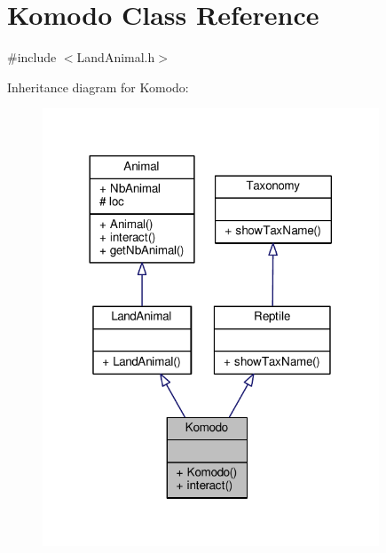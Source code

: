 \hypertarget{classKomodo}{}\section{Komodo Class Reference}
\label{classKomodo}


{\ttfamily \#include $<$Land\+Animal.\+h$>$}



Inheritance diagram for Komodo\+:
\nopagebreak
\begin{figure}[H]
\begin{center}
\leavevmode
\includegraphics[width=284pt]{classKomodo__inherit__graph}
\end{center}
\end{figure}


